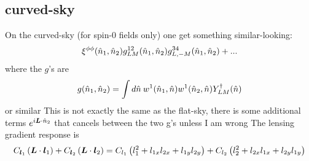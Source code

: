 \documentclass[11pt]{article}
\begin{document}
\subsection{curved-sky}
On the curved-sky (for spin-0 fields only) one get something similar-looking:
\begin{equation}
\xi^{\phi\phi}({\hat n}_1,{\hat n}_2) g^{12}_{LM}({\hat n}_1,{\hat n}_2) g^{34}_{L,-M}({\hat n}_1,{\hat n}_2) + ...
\end{equation}
where the $g$'s are
\begin{equation}
	g({\hat n}_1, {\hat n}_2) = \int d{\hat n} \:w^1({\hat n}_1, {\hat n})w^1({\hat n}_2, {\hat n}) Y^\dagger_{LM}({\hat n})
\end{equation}
or similar
\color{red} This is not exactly the same as the flat-sky, there is some additional terms $e^{i \boldsymbol{L} \cdot {\hat n}_2}$ that cancels between the two g's unless I am wrong
\color{black}
The lensing gradient response is
\begin{equation}
	C_{\boldsymbol{l}_1} \left( \boldsymbol{L} \cdot \boldsymbol{l}_1 \right) + C_{\boldsymbol{l}_2} \left( \boldsymbol{L} \cdot \boldsymbol{l}_2 \right) = C_{l_1}\left( l_1^2  + l_{1x} l_{2x} + l_{1y} l_{2y}\right) + C_{l_2}\left( l_2^2  + l_{2x} l_{1x} + l_{2y} l_{1y}\right)
\end{equation}
\end{document}
